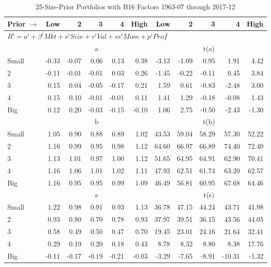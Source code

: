 
\begin{table}[H]
\footnotesize
\centering
\caption{25-Size-Prior Portfolios with B16 Factors 1963-07 through 2017-12}
\begin{tabular}{lrrrrrrrrrr}
  \toprule
    
    Prior $\rightarrow$ & Low & 2 & 3 & 4 & High & Low & 2 & 3 & 4 & High  \\ 
  \midrule
  \multicolumn{11}{l}{$R^i=a^i+\beta^iMkt+s^iSize+v^iVal+m^iMom+p^iProf$}  \\
  
     & \multicolumn{5}{c}{a} & \multicolumn{5}{c}{t(a)}   \\
     \cmidrule(r){2-6} \cmidrule(r){7-11} 
    Small  & -0.33  & -0.07  & 0.06  & 0.13  & 0.38  & -3.13  & -1.09  & 0.95  & 1.91  & 4.42   \\
    2  & -0.11  & -0.01  & -0.01  & 0.03  & 0.26  & -1.45  & -0.22  & -0.11  & 0.45  & 3.84   \\
    3  & 0.15  & 0.04  & -0.05  & -0.17  & 0.21  & 1.59  & 0.61  & -0.83  & -2.48  & 3.00   \\
    4  & 0.15  & 0.10  & -0.01  & -0.01  & 0.11  & 1.41  & 1.29  & -0.18  & -0.08  & 1.43   \\
    Big  & 0.12  & 0.20  & -0.03  & -0.15  & -0.10  & 1.06  & 2.75  & -0.50  & -2.43  & -1.30   \\
    
  
     & \multicolumn{5}{c}{b} & \multicolumn{5}{c}{t(b)}   \\
     \cmidrule(r){2-6} \cmidrule(r){7-11} 
    Small  & 1.05  & 0.90  & 0.88  & 0.89  & 1.02  & 43.53  & 59.04  & 58.29  & 57.30  & 52.22   \\
    2  & 1.16  & 0.99  & 0.95  & 0.98  & 1.12  & 64.60  & 66.97  & 66.89  & 74.40  & 72.40   \\
    3  & 1.13  & 1.01  & 0.97  & 1.00  & 1.12  & 51.65  & 64.95  & 64.91  & 62.90  & 70.41   \\
    4  & 1.16  & 1.06  & 1.01  & 1.02  & 1.11  & 47.93  & 62.51  & 61.74  & 63.20  & 62.57   \\
    Big  & 1.16  & 0.95  & 0.95  & 0.99  & 1.09  & 46.49  & 56.81  & 60.95  & 67.68  & 64.46   \\
    
  
     & \multicolumn{5}{c}{s} & \multicolumn{5}{c}{t(s)}   \\
     \cmidrule(r){2-6} \cmidrule(r){7-11} 
    Small  & 1.22  & 0.98  & 0.91  & 0.93  & 1.13  & 36.78  & 47.15  & 44.24  & 43.71  & 41.98   \\
    2  & 0.93  & 0.80  & 0.70  & 0.78  & 0.93  & 37.97  & 39.51  & 36.15  & 43.56  & 44.05   \\
    3  & 0.58  & 0.49  & 0.50  & 0.47  & 0.70  & 19.45  & 23.01  & 24.16  & 21.64  & 32.41   \\
    4  & 0.29  & 0.19  & 0.20  & 0.18  & 0.43  & 8.78  & 8.32  & 8.80  & 8.38  & 17.76   \\
    Big  & -0.11  & -0.17  & -0.19  & -0.21  & -0.03  & -3.29  & -7.65  & -8.91  & -10.31  & -1.32   \\
    

\end{tabular}
\end{table}
